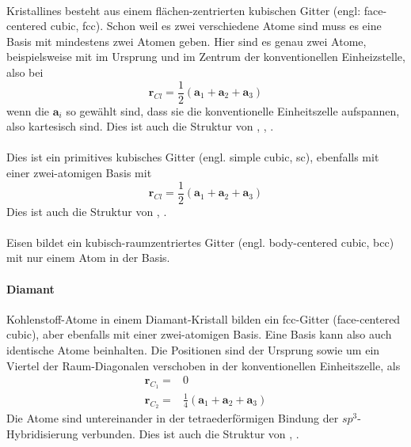 \paragraph{}
Kristallines  besteht aus einem flächen-zentrierten kubischen Gitter (engl: face-centered cubic, fcc). Schon weil es zwei verschiedene Atome sind muss es eine Basis mit mindestens zwei Atomen geben. Hier sind es genau zwei Atome,  beispielsweise mit  im Ursprung und  im Zentrum der konventionellen Einheizstelle, also bei
\begin{equation}
 \mathbf{r}_{Cl} = \frac{1}{2} \left(\mathbf{a}_1 + \mathbf{a}_2 +  \mathbf{a}_3  \right)
\end{equation}
wenn die $\mathbf{a}_i$ so gewählt sind, dass sie die konventionelle Einheitszelle aufspannen, also kartesisch sind. Dies ist auch die Struktur von , , .



\paragraph{}
Dies ist ein primitives kubisches Gitter (engl. simple cubic, sc), ebenfalls mit einer zwei-atomigen Basis mit 
\begin{equation}
 \mathbf{r}_{Cl} = \frac{1}{2} \left(\mathbf{a}_1 + \mathbf{a}_2 +  \mathbf{a}_3  \right)
\end{equation}
Dies ist auch die Struktur von , .

\paragraph{} Eisen bildet ein kubisch-raumzentriertes Gitter (engl. body-centered cubic, bcc) mit nur einem Atom in der Basis.

\paragraph{Diamant} Kohlenstoff-Atome in einem Diamant-Kristall bilden ein fcc-Gitter (face-centered cubic), aber ebenfalls mit einer zwei-atomigen Basis. Eine Basis kann also auch identische Atome beinhalten. Die Positionen sind der Ursprung sowie um ein Viertel der Raum-Diagonalen verschoben in der konventionellen Einheitszelle, als
\begin{align}
 \mathbf{r}_{C_1} = & 0 \\
 \mathbf{r}_{C_2} = & \frac{1}{4} \left(\mathbf{a}_1 + \mathbf{a}_2 +  \mathbf{a}_3  \right)
\end{align}
Die Atome sind untereinander in der tetraederförmigen Bindung der $sp^3$-Hybridisierung verbunden. Dies ist auch die Struktur von , .

